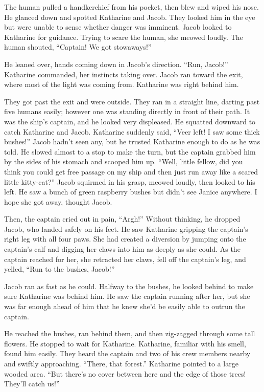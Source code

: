The human pulled a handkerchief from his pocket, then blew and wiped his nose. He glanced down and spotted Katharine and Jacob. They looked him in the eye but were unable to sense whether danger was imminent. Jacob looked to Katharine for guidance. Trying to scare the human, she meowed loudly. The human shouted, “Captain! We got stowaways!”

He leaned over, hands coming down in Jacob's direction. “Run, Jacob!” Katharine commanded, her instincts taking over. Jacob ran toward the exit, where most of the light was coming from. Katharine was right behind him.

They got past the exit and were outside. They ran in a straight line, darting past five humans easily; however one was standing directly in front of their path. It was the ship's captain, and he looked very displeased. He squatted downward to catch Katharine and Jacob. Katharine suddenly said, “Veer left! I saw some thick bushes!” Jacob hadn't seen any, but he trusted Katharine enough to do as he was told. He slowed almost to a stop to make the turn, but the captain grabbed him by the sides of his stomach and scooped him up. “Well, little fellow, did you think you could get free passage on my ship and then just run away like a scared little kitty-cat?” Jacob squirmed in his grasp, meowed loudly, then looked to his left. He saw a bunch of green raspberry bushes but didn't see Janice anywhere. I hope she got away, thought Jacob.

Then, the captain cried out in pain, “Argh!” Without thinking, he dropped Jacob, who landed safely on his feet. He saw Katharine gripping the captain's right leg with all four paws. She had created a diversion by jumping onto the captain's calf and digging her claws into him as deeply as she could. As the captain reached for her, she retracted her claws, fell off the captain's leg, and yelled, “Run to the bushes, Jacob!”

Jacob ran as fast as he could. Halfway to the bushes, he looked behind to make sure Katharine was behind him. He saw the captain running after her, but she was far enough ahead of him that he knew she'd be easily able to outrun the captain.

He reached the bushes, ran behind them, and then zig-zagged through some tall flowers. He stopped to wait for Katharine. Katharine, familiar with his smell, found him easily. They heard the captain and two of his crew members nearby and swiftly approaching. “There, that forest.” Katharine pointed to a large wooded area. “But there's no cover between here and the edge of those trees! They'll catch us!”

